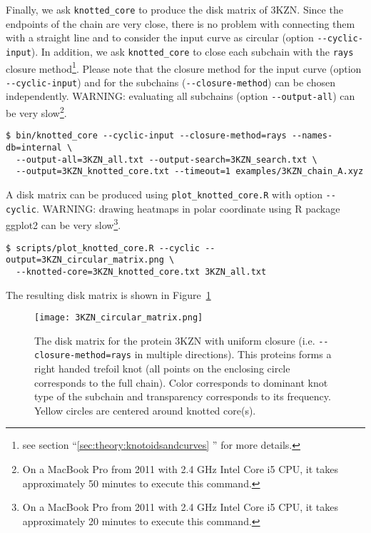 Finally, we ask \lstinline{knotted_core} to produce the disk matrix of 3KZN. Since the endpoints of the chain are very close, there is no problem with connecting them with a straight line and to consider the input curve as circular (option \lstinline{--cyclic-input}). In addition, we ask \lstinline{knotted_core} to close each subchain with the \lstinline{rays} closure method\footnote{see section ``\ref{sec:theory:knotoidsandcurves} '' for more details.}. Please note that the closure method for the input curve (option \lstinline{--cyclic-input}) and for the subchains (\lstinline{--closure-method}) can be chosen independently. WARNING: evaluating all subchains (option \lstinline{--output-all}) can be very slow\footnote{On a MacBook Pro from 2011 with 2.4 GHz Intel Core i5 CPU, it takes approximately 50 minutes to execute this command.}.
\begin{lstlisting}
$ bin/knotted_core --cyclic-input --closure-method=rays --names-db=internal \
  --output-all=3KZN_all.txt --output-search=3KZN_search.txt \
  --output=3KZN_knotted_core.txt --timeout=1 examples/3KZN_chain_A.xyz
\end{lstlisting}

A disk matrix can be produced using \lstinline{plot_knotted_core.R} with option \lstinline{--cyclic}.  WARNING: drawing heatmaps in polar coordinate using {\ttfamily R} package {\ttfamily ggplot2}\cite{wickham2009} can be very slow\footnote{On a MacBook Pro from 2011 with 2.4 GHz Intel Core i5 CPU, it takes approximately 20 minutes to execute this command.}.
\begin{lstlisting}
$ scripts/plot_knotted_core.R --cyclic --output=3KZN_circular_matrix.png \
  --knotted-core=3KZN_knotted_core.txt 3KZN_all.txt
\end{lstlisting}
The resulting disk matrix is shown in Figure~\ref{fig:3KZN:disk}
\begin{figure}[t]
\centering
\texttt{[image: 3KZN\_circular\_matrix.png]}
\caption{The disk matrix for the protein 3KZN with uniform closure (i.e. \lstinline{--closure-method=rays} in multiple directions). This proteins forms a right handed trefoil knot (all points on the enclosing circle corresponds to the full chain). Color corresponds to dominant knot type of the subchain and transparency corresponds to its frequency. Yellow circles are centered around knotted core(s).}\label{fig:3KZN:disk}
\end{figure}



\clearpage
